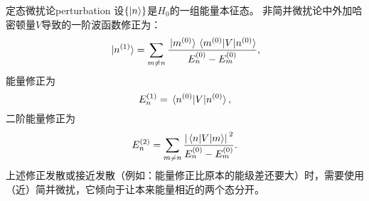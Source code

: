 \begin{back}{定态微扰论}{perturbation}
    设$\{\ket{n}\}$是$H_0$的一组能量本征态。
    非简并微扰论中外加哈密顿量$V$导致的一阶波函数修正为：
    \[
        \ket*{n^{(1)}} = \sum_{m \neq n} \frac{\ket*{m^{(0)}} \mel*{m^{(0)}}{V}{n^{(0)}}}{E_n^{(0)} - E_m^{(0)}},
    \]
    能量修正为
    \[
        E^{(1)}_n = \mel*{n^{(0)}}{V}{n^{(0)}},
    \]
    二阶能量修正为
    \[
        E^{(2)}_n = \sum_{m \neq n} \frac{\abs*{\mel*{n}{V}{m}}^2}{E_n^{(0)} - E_m^{(0)}}.
    \]
    上述修正发散或接近发散（例如：能量修正比原本的能级差还要大）时，需要使用（近）简并微扰，它倾向于让本来能量相近的两个态分开。
\end{back}